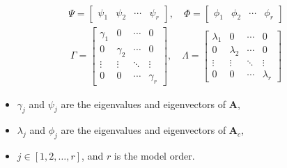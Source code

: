 \documentclass[letterpaper,10pt,english]{sphinxmanual}
\begin{document}
\begin{equation*}
\begin{split}\Psi =
\begin{bmatrix}
\psi_{1} & \psi_{2} & \cdots & \psi_{r}
\end{bmatrix}, \quad{}
\Phi =
\begin{bmatrix}
\phi_{1} & \phi_{2} & \cdots & \phi_{r}
\end{bmatrix}\end{split}
\end{equation*}\begin{equation*}
\begin{split}\Gamma =
\begin{bmatrix}
\gamma_{1} & 0 & \cdots & 0 \\
0 & \gamma_{2} & \cdots & 0 \\
\vdots & \vdots & \ddots & \vdots \\
0 & 0 & \cdots & \gamma_{r}
\end{bmatrix}, \quad
\Lambda = \begin{bmatrix}
\lambda_{1} & 0 & \cdots & 0 \\
0 & \lambda_{2} & \cdots & 0 \\
\vdots & \vdots & \ddots & \vdots \\
0 & 0 & \cdots & \lambda_{r}
\end{bmatrix}\end{split}
\end{equation*}\begin{itemize}
\item {} 
\sphinxAtStartPar
\(\gamma_{j}\) and \(\psi_{j}\) are the eigenvalues and
eigenvectors of \(\mathbf{A}\),

\item {} 
\sphinxAtStartPar
\(\lambda_{j}\) and \(\phi_{j}\) are the eigenvalues and
eigenvectors of \(\mathbf{A}_{c}\),

\item {} 
\sphinxAtStartPar
\(j \in [1,2,\dots,r]\), and \(r\) is the model order.

\end{itemize}
\end{document}
